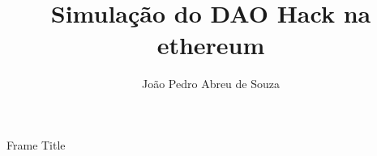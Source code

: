 \documentclass{beamer}
\title{Simulação do DAO Hack na ethereum}
\author{João Pedro Abreu de Souza}
\begin{document}
\begin{frame}[plain]
    \maketitle
\end{frame}
\begin{frame}{Frame Title}
\end{frame}
\end{document}
